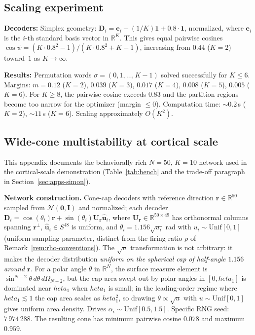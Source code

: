 \documentclass[12pt]{article}
\newcommand{\vv}[1]{\mathbf{#1}}
\newcommand{\DD}{\vv{D}}
\newcommand{\RR}{\mathbb{R}}
\begin{document}
\subsection{Scaling experiment}\label{app:scaling}

\textbf{Decoders:} Simplex geometry: $\DD_i = \vv{e}_i - (1/K)\vv{1} + 0.8\cdot\vv{1}$, normalized, where $\vv{e}_i$ is the $i$-th standard basis vector in $\RR^K$. This gives equal pairwise cosines $\cos\psi=(K\cdot 0.8^2-1)/(K\cdot 0.8^2+K-1)$, increasing from $0.44$ ($K=2$) toward~$1$ as $K\to\infty$.

\textbf{Results:} Permutation words $\sigma=(0,1,\ldots,K{-}1)$ solved successfully for $K\leq 6$. Margins: $m=0.12$ ($K=2$), $0.039$ ($K=3$), $0.017$ ($K=4$), $0.008$ ($K=5$), $0.005$ ($K=6$). For $K\geq 8$, the pairwise cosine exceeds $0.83$ and the partition regions become too narrow for the optimizer (margin $\leq 0$). Computation time: ${\sim}0.2$\,s ($K=2$), ${\sim}11$\,s ($K=6$). Scaling approximately $O(K^2)$.

\subsection{Wide-cone multistability at cortical scale}\label{app:wide-cone-multi}

This appendix documents the behaviorally rich $N=50$, $K=10$ network used in the cortical-scale demonstration (Table~\ref{tab:bench} and the trade-off paragraph in Section~\ref{sec:apps-simon}).

\textbf{Network construction.} Cone-cap decoders with reference direction $\vv{r}\in\RR^{50}$ sampled from $\mathcal{N}(\vv{0},\vv{I})$ and normalized; each decoder $\DD_i = \cos(\theta_i)\vv{r} + \sin(\theta_i)\vv{U}_{\vv{r}}\hat{\vv{u}}_i$, where $\vv{U}_{\vv{r}}\in\RR^{50\times 49}$ has orthonormal columns spanning $\vv{r}^\perp$, $\hat{\vv{u}}_i\in S^{48}$ is uniform, and $\theta_i = 1.156 \sqrt{u_i}$ rad with $u_i\sim\mathrm{Unif}[0,1]$ (uniform sampling parameter, distinct from the firing ratio $\rho$ of Remark~\ref{rem:rho-conventions}). The $\sqrt{u}$ transformation is not arbitrary: it makes the decoder distribution \emph{uniform on the spherical cap of half-angle $1.156$ around $\vv{r}$}. For a polar angle $\theta$ in $\RR^N$, the surface measure element is $\sin^{N-2}\theta\,d\theta\,d\Omega_{N-2}$, but the cap area swept out by polar angles in $[0, 	heta_1]$ is dominated near $	heta_1$ when $	heta_1$ is small; in the leading-order regime where $	heta_1\lesssim 1$ the cap area scales as $	heta_1^2$, so drawing $\theta\propto\sqrt{u}$ with $u\sim\mathrm{Unif}[0,1]$ gives uniform area density. Drives $\alpha_i\sim\mathrm{Unif}[0.5,1.5]$. Specific RNG seed: $7\,974\,288$. The resulting cone has minimum pairwise cosine $0.078$ and maximum $0.959$.
\end{document}

